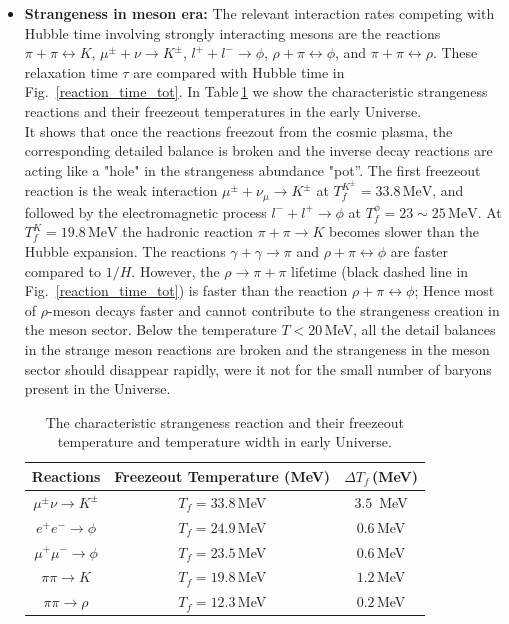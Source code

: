 \documentclass[universe,article,submit,moreauthors,pdftex,a4paper]{Definitions/mdpi}
\begin{document}
\begin{itemize}
\item \textbf{Strangeness in meson era:}
The relevant interaction rates competing with Hubble time involving strongly interacting mesons are the reactions $\pi+\pi\leftrightarrow K$, $\mu^\pm+\nu\rightarrow K^\pm$, $l^++l^-\rightarrow\phi$, $\rho+\pi\leftrightarrow\phi$, and $\pi+\pi\leftrightarrow\rho$. 
 These relaxation time $\tau$  are compared with Hubble time in Fig.~\ref{reaction_time_tot}. In Table\,\ref{FreezeoutTemperature_table} we show the characteristic strangeness reactions and their freezeout temperatures in the early Universe. 
\\
It shows that once the reactions freezout from the cosmic plasma, the corresponding detailed balance is broken and the inverse decay reactions are acting like a "hole" in the strangeness abundance "pot”.
The first freezeout reaction is the weak interaction $\mu^\pm+\nu_{\mu}\rightarrow K^\pm$ at $T_f^{K^\pm}=33.8\,\mathrm{MeV}$, and followed by the electromagnetic process $l^-+l^+\rightarrow\phi$ at $T_f^\phi=23\sim25\,\mathrm{MeV}$. At $T_f^K=19.8\,\mathrm{MeV}$ the hadronic reaction $\pi+\pi\rightarrow K$ becomes slower than the Hubble expansion. The reactions $\gamma+\gamma\rightarrow\pi$ and $\rho+\pi\leftrightarrow\phi$ are faster compared to $1/H$. However, the $\rho\to\pi+\pi$ lifetime (black dashed line in Fig.~\ref{reaction_time_tot}) is faster than the reaction $\rho+\pi\leftrightarrow\phi$; Hence most of $\rho$-meson decays faster and cannot contribute to the strangeness creation in the meson sector. Below the temperature $T<20$\,MeV, all the detail balances in the strange meson reactions are broken and the strangeness in the meson sector should disappear rapidly, were it not for the small number of baryons present in the Universe.
\begin{table}%
\caption{The characteristic strangeness reaction and their freezeout temperature and temperature width in early Universe.}
\label{FreezeoutTemperature_table} 
\centering
\begin{tabular}{c| c| c}
\hline\hline
Reactions &Freezeout Temperature (MeV) & {$\Delta T_f$\,(MeV)} \\
\hline
$\mu^\pm\nu\rightarrow K^\pm$ & $T_f=33.8$\,MeV & {$3.5$ \,MeV}\\ 
\hline
$e^+e^-\rightarrow \phi$ & $T_f=24.9$\,MeV &{$0.6$\,MeV}\\
$\mu^+\mu^-\rightarrow\phi$ & $T_f=23.5$\,MeV &{$0.6$\,MeV}\\
\hline
 $\pi\pi\rightarrow K$ & $T_f=19.8$\,MeV&{$1.2$\,MeV}\\
\hline
$\pi\pi\rightarrow\rho$ & $T_f=12.3$\,MeV&{$0.2$\,MeV}\\
\hline\hline
\end{tabular}
\end{table}


\end{itemize}
\end{document}
